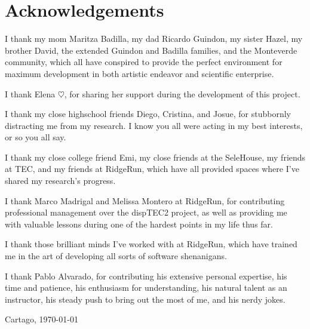 \chapter*{Acknowledgements}
\thispagestyle{empty}

I thank my mom Maritza Badilla, my dad Ricardo Guindon, my sister Hazel, my brother David, the extended Guindon and Badilla families, and the Monteverde community, which all have conspired to provide the perfect environment for maximum development in both artistic endeavor and scientific enterprise.

I thank Elena $\heartsuit$, for sharing her support during the development of this project.

I thank my close highschool friends Diego, Cristina, and Josue, for stubbornly distracting me from my research. I know you all were acting in my best interests, or so you all say.

I thank my close college friend Emi, my close friends at the SeleHouse, my friends at TEC, and my friends at RidgeRun, which have all provided spaces where I've shared my research's progress.

I thank Marco Madrigal and Melissa Montero at RidgeRun, for contributing professional management over the dispTEC2 project, as well as providing me with valuable lessons during one of the hardest points in my life thus far.

I thank those brilliant minds I've worked with at RidgeRun, which have trained me in the art of developing all sorts of software shenanigans.

I thank Pablo Alvarado, for contributing his extensive personal expertise, his time and patience, his enthusiasm for understanding, his natural talent as an instructor, his steady push to bring out the most of me, and his nerdy jokes.

\vspace*{1cm}

\thesisAuthor

Cartago, \today

\cleardoublepage

